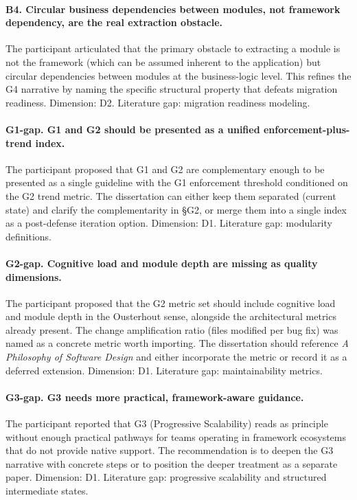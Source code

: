\paragraph*{B4. Circular business dependencies between modules, not framework dependency, are the real extraction obstacle.} The participant articulated that the primary obstacle to extracting a module is not the framework (which can be assumed inherent to the application) but circular dependencies between modules at the business-logic level. This refines the G4 narrative by naming the specific structural property that defeats migration readiness. Dimension: D2. Literature gap: migration readiness modeling.

\paragraph*{G1-gap. G1 and G2 should be presented as a unified enforcement-plus-trend index.} The participant proposed that G1 and G2 are complementary enough to be presented as a single guideline with the G1 enforcement threshold conditioned on the G2 trend metric. The dissertation can either keep them separated (current state) and clarify the complementarity in §G2, or merge them into a single index as a post-defense iteration option. Dimension: D1. Literature gap: modularity definitions.

\paragraph*{G2-gap. Cognitive load and module depth are missing as quality dimensions.} The participant proposed that the G2 metric set should include cognitive load and module depth in the Ousterhout sense, alongside the architectural metrics already present. The change amplification ratio (files modified per bug fix) was named as a concrete metric worth importing. The dissertation should reference \emph{A Philosophy of Software Design} and either incorporate the metric or record it as a deferred extension. Dimension: D1. Literature gap: maintainability metrics.

\paragraph*{G3-gap. G3 needs more practical, framework-aware guidance.} The participant reported that G3 (Progressive Scalability) reads as principle without enough practical pathways for teams operating in framework ecosystems that do not provide native support. The recommendation is to deepen the G3 narrative with concrete steps or to position the deeper treatment as a separate paper. Dimension: D1. Literature gap: progressive scalability and structured intermediate states.

